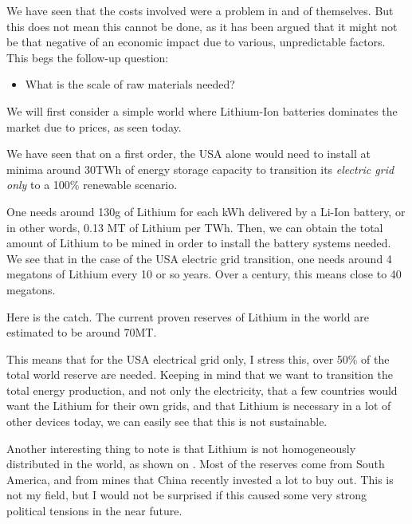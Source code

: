 \begin{kaobox}[frametitle=The Most Important Question]
We have seen that the costs involved were a problem in and of themselves. But this does not mean this cannot be done, as it has been argued that it might not be that negative of an economic impact due to various, unpredictable factors. This begs the follow-up question:

\begin{itemize}
\item What is the scale of raw materials needed?
\end{itemize}

\end{kaobox}

We will first consider a simple world where Lithium-Ion batteries dominates the market due to prices, as seen today.

We have seen that on a first order, the USA alone would need to install at minima around 30TWh of energy storage capacity to transition its \emph{electric grid only} to a 100\% renewable scenario.

One needs around 130g of Lithium for each kWh delivered by a Li-Ion battery, or in other words, 0.13 MT of Lithium per TWh. Then, we can obtain the total amount of Lithium to be mined in order to install the battery systems needed. We see that in the case of the USA electric grid transition, one needs around 4 megatons of Lithium every 10 or so years. Over a century, this means close to 40 megatons. 

Here is the catch. The current proven reserves of Lithium in the world are estimated to be around 70MT.

This means that for the USA electrical grid only, I stress this, over 50\% of the total world reserve are needed. Keeping in mind that we want to transition the total energy production, and not only the electricity, that a few countries would want the Lithium for their own grids, and that Lithium is necessary in a lot of other devices today, we can easily see that this is not sustainable.

Another interesting thing to note is that Lithium is not homogeneously distributed in the world, as shown on . Most of the reserves come from South America, and from mines that China recently invested a lot to buy out. This is not my field, but I would not be surprised if this caused some very strong political tensions in the near future.


